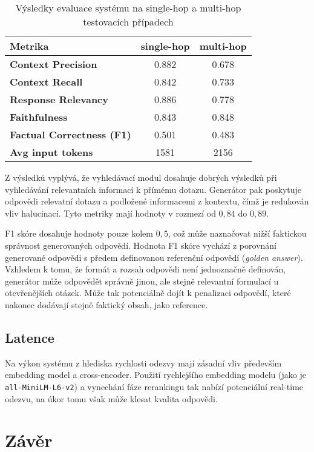 \begin{table}[H]
\centering
\begin{tabular}{lcc}
\toprule
\textbf{Metrika} & \textbf{single-hop} & \textbf{multi-hop} \\
\midrule
\textbf{Context Precision}         & 0.882 & 0.678 \\
\textbf{Context Recall}            & 0.842 & 0.733 \\
\textbf{Response Relevancy}        & 0.886 & 0.778 \\
\textbf{Faithfulness}              & 0.843 & 0.848 \\
\textbf{Factual Correctness (F1)}  & 0.501 & 0.483 \\
\textbf{Avg input tokens}          & 1581 & 2156 \\
\bottomrule
\end{tabular}
\caption{Výsledky evaluace systému na single-hop a multi-hop testovacích případech}
\label{tab:finaleval}
\end{table}

Z výsledků vyplývá, že vyhledávací modul dosahuje dobrých výsledků při vyhledávání relevantních informací k přímému dotazu. Generátor pak poskytuje odpovědi relevatní dotazu a podložené informacemi z kontextu, čímž je redukován vliv halucinací. Tyto metriky mají hodnoty v rozmezí od $0{,}84$ do $0{,}89$.

F1 skóre dosahuje hodnoty pouze kolem $0{,}5$, což může naznačovat nižší faktickou správnost generovaných odpovědí. Hodnota F1 skóre vychází z porovnání generované odpovědi s předem definovanou referenční odpovědí (\textit{golden answer}). Vzhledem k tomu, že formát a rozsah odpovědi není jednoznačně definován, generátor může odpovědět správně jinou, ale stejně relevantní formulací u otevřenějších otázek. Může tak potenciálně dojít k penalizaci odpovědí, které nakonec dodávají stejně faktický obsah, jako reference.


\section{Latence}

Na výkon systému z hlediska rychlosti odezvy mají zásadní vliv především embedding model a cross-encoder. Použití rychlejšího embedding modelu (jako je \texttt{all-MiniLM-L6-v2}) a vynechání fáze rerankingu tak nabízí potenciální real-time odezvu, na úkor tomu však může klesat kvalita odpovědi. 


\chapter{Závěr}



%